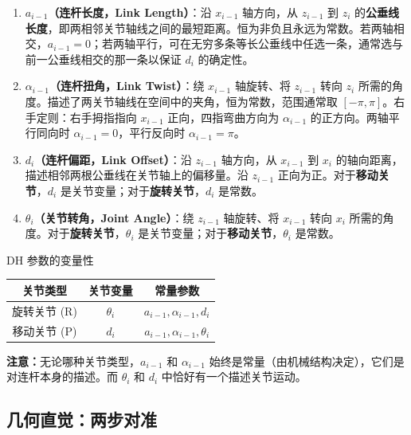 \begin{enumerate}
	\item \textbf{$a_{i-1}$（连杆长度，Link Length）}：沿 $x_{i-1}$ 轴方向，从 $z_{i-1}$ 到 $z_i$ 的\textbf{公垂线长度}，即两相邻关节轴线之间的最短距离。恒为非负且永远为常数。若两轴相交，$a_{i-1}=0$；若两轴平行，可在无穷多条等长公垂线中任选一条，通常选与前一公垂线相交的那一条以保证 $d_i$ 的确定性。
	
	\item \textbf{$\alpha_{i-1}$（连杆扭角，Link Twist）}：绕 $x_{i-1}$ 轴旋转、将 $z_{i-1}$ 转向 $z_i$ 所需的角度。描述了两关节轴线在空间中的夹角，恒为常数，范围通常取 $[-\pi, \pi]$。右手定则：右手拇指指向 $x_{i-1}$ 正向，四指弯曲方向为 $\alpha_{i-1}$ 的正方向。两轴平行同向时 $\alpha_{i-1}=0$，平行反向时 $\alpha_{i-1}=\pi$。
	
	\item \textbf{$d_i$（连杆偏距，Link Offset）}：沿 $z_{i-1}$ 轴方向，从 $x_{i-1}$ 到 $x_i$ 的轴向距离，描述相邻两根公垂线在关节轴上的偏移量。沿 $z_{i-1}$ 正向为正。对于\textbf{移动关节}，$d_i$ 是关节变量；对于\textbf{旋转关节}，$d_i$ 是常数。
	
	\item \textbf{$\theta_i$（关节转角，Joint Angle）}：绕 $z_{i-1}$ 轴旋转、将 $x_{i-1}$ 转向 $x_i$ 所需的角度。对于\textbf{旋转关节}，$\theta_i$ 是关节变量；对于\textbf{移动关节}，$\theta_i$ 是常数。
\end{enumerate}

\begin{myTheorem}{DH 参数的变量性}
	\begin{center}
		\begin{tabular}{ccc}
			\toprule
			关节类型 & 关节变量 & 常量参数 \\
			\midrule
			旋转关节 (R) & $\theta_i$ & $a_{i-1}, \alpha_{i-1}, d_i$ \\
			移动关节 (P) & $d_i$     & $a_{i-1}, \alpha_{i-1}, \theta_i$ \\
			\bottomrule
		\end{tabular}
	\end{center}
\end{myTheorem}

\textbf{注意：}无论哪种关节类型，$a_{i-1}$ 和 $\alpha_{i-1}$ 始终是常量（由机械结构决定），它们是对连杆本身的描述。而 $\theta_i$ 和 $d_i$ 中恰好有一个描述关节运动。

\subsection{几何直觉：两步对准}

